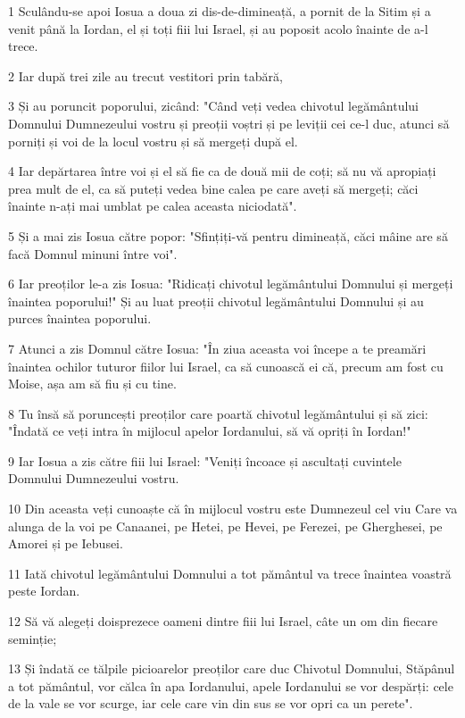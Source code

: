 \par 1 Sculându-se apoi Iosua a doua zi dis-de-dimineață, a pornit de la Sitim și a venit până la Iordan, el și toți fiii lui Israel, și au poposit acolo înainte de a-l trece.
\par 2 Iar după trei zile au trecut vestitori prin tabără,
\par 3 Și au poruncit poporului, zicând: "Când veți vedea chivotul legământului Domnului Dumnezeului vostru și preoții voștri și pe leviții cei ce-l duc, atunci să porniți și voi de la locul vostru și să mergeți după el.
\par 4 Iar depărtarea între voi și el să fie ca de două mii de coți; să nu vă apropiați prea mult de el, ca să puteți vedea bine calea pe care aveți să mergeți; căci înainte n-ați mai umblat pe calea aceasta niciodată".
\par 5 Și a mai zis Iosua către popor: "Sfințiți-vă pentru dimineață, căci mâine are să facă Domnul minuni între voi".
\par 6 Iar preoților le-a zis Iosua: "Ridicați chivotul legământului Domnului și mergeți înaintea poporului!" Și au luat preoții chivotul legământului Domnului și au purces înaintea poporului.
\par 7 Atunci a zis Domnul către Iosua: "În ziua aceasta voi începe a te preamări înaintea ochilor tuturor fiilor lui Israel, ca să cunoască ei că, precum am fost cu Moise, așa am să fiu și cu tine.
\par 8 Tu însă să poruncești preoților care poartă chivotul legământului și să zici: "Îndată ce veți intra în mijlocul apelor Iordanului, să vă opriți în Iordan!"
\par 9 Iar Iosua a zis către fiii lui Israel: "Veniți încoace și ascultați cuvintele Domnului Dumnezeului vostru.
\par 10 Din aceasta veți cunoaște că în mijlocul vostru este Dumnezeul cel viu Care va alunga de la voi pe Canaanei, pe Hetei, pe Hevei, pe Ferezei, pe Gherghesei, pe Amorei și pe Iebusei.
\par 11 Iată chivotul legământului Domnului a tot pământul va trece înaintea voastră peste Iordan.
\par 12 Să vă alegeți doisprezece oameni dintre fiii lui Israel, câte un om din fiecare seminție;
\par 13 Și îndată ce tălpile picioarelor preoților care duc Chivotul Domnului, Stăpânul a tot pământul, vor călca în apa Iordanului, apele Iordanului se vor despărți: cele de la vale se vor scurge, iar cele care vin din sus se vor opri ca un perete".
